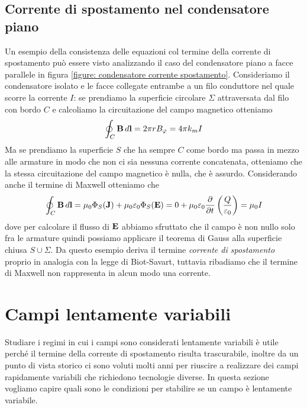 \subsection{Corrente di spostamento nel condensatore piano}

Un esempio della consistenza delle equazioni col termine della corrente di spostamento può essere visto analizzando il caso del 
condensatore piano a facce parallele in figura \ref{figure: condensatore corrente spostamento}. Consideriamo il condensatore isolato e le facce collegate 
entrambe a un filo conduttore nel quale scorre la corrente 
$ I $: se prendiamo la superficie circolare $ \Sigma $ attraversata dal filo con bordo $ C $ e calcoliamo la circuitazione del campo magnetico otteniamo
\begin{equation}
  \oint_{C} \mathbf{ B } \, d\mathbf{ l } = 2\pi r B_{\varphi} = 4\pi k_m I
\end{equation}
Ma se prendiamo la superficie $ S $ che ha sempre $ C $ come bordo ma passa in mezzo alle armature in modo che non ci sia nessuna 
corrente concatenata, otteniamo che la stessa circuitazione del campo magnetico è nulla, che è assurdo. Considerando anche il 
termine di Maxwell otteniamo che
\begin{equation}
  \oint_{C} \mathbf{ B } \, d\mathbf{ l } = \mu_0 \Phi_S(\mathbf{ J }) + \mu_0 \varepsilon_0 \Phi_S(\mathbf{ E }) 
  = 0 + \mu_0 \varepsilon_0 \frac{\partial^{} {}}{\partial {t}^{}} \left( \frac{Q}{\varepsilon_0} \right) = \mu_0 I
\end{equation}
dove per calcolare il flusso di $ \mathbf{ E } $ abbiamo sfruttato che il campo è non nullo solo fra le armature quindi possiamo 
applicare il teorema di Gauss alla superficie chiusa $ S \cup \Sigma $. 
Da questo esempio deriva il termine \textit{corrente di spostamento} proprio in analogia con la legge di Biot-Savart, tuttavia ribadiamo che il termine di 
Maxwell non rappresenta in alcun modo una corrente.

\section{Campi lentamente variabili} \label{section: campi lentamente variabili}
Studiare i regimi in cui i campi sono considerati lentamente variabili è utile perché il termine della corrente di spostamento risulta trascurabile, 
inoltre da un punto di vista storico ci sono voluti molti anni per riuscire a realizzare dei campi rapidamente variabili che richiedono tecnologie 
diverse. In questa sezione vogliamo capire quali sono le condizioni per stabilire se un campo è lentamente variabile.

